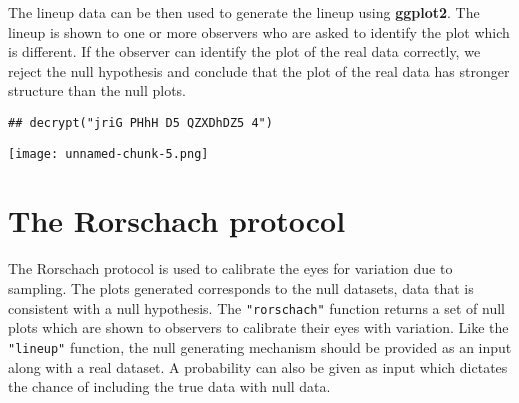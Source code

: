 The lineup data can be then used to generate the lineup using
\textbf{ggplot2}. The lineup is shown to one or more observers who are
asked to identify the plot which is different. If the observer can
identify the plot of the real data correctly, we reject the null
hypothesis and conclude that the plot of the real data has stronger
structure than the null plots.

\begin{Shaded}
\begin{Highlighting}[]
 \NormalTok{(}\NormalTok{(}\StringTok{ }\NormalTok{(~}\StringTok{ }
\end{Highlighting}
\end{Shaded}

\begin{verbatim}
## decrypt("jriG PHhH D5 QZXDhDZ5 4")
\end{verbatim}

\begin{figure*}[hbtp]
\begin{center}
\texttt{[image: unnamed-chunk-5.png]}
\end{center}
\end{figure*}

\section{The Rorschach protocol}\label{the-rorschach-protocol}

The Rorschach protocol is used to calibrate the eyes for variation due
to sampling. The plots generated corresponds to the null datasets, data
that is consistent with a null hypothesis. The \texttt{"rorschach"}
function returns a set of null plots which are shown to observers to
calibrate their eyes with variation. Like the \texttt{"lineup"}
function, the null generating mechanism should be provided as an input
along with a real dataset. A probability can also be given as input
which dictates the chance of including the true data with null data.

\begin{Shaded}
\begin{Highlighting}[]
\NormalTok{(}\NormalTok{(}\NormalTok{(} \NormalTok{, } \NormalTok{), }\NormalTok{)}
\end{Highlighting}
\end{Shaded}

